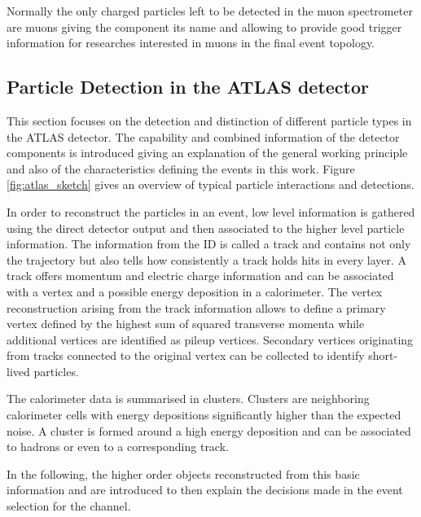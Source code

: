 Normally the only charged particles left to be detected in the muon spectrometer are muons giving the component its name and allowing to provide good trigger information for researches interested in muons in the final event topology.





\subsection{Particle Detection in the ATLAS detector}

This section focuses on the detection and distinction of different particle types in the ATLAS detector. The capability and combined information of the detector components is introduced giving an explanation of the general working principle and also of the characteristics defining the events in this work. Figure \ref{fig:atlas_sketch} gives an overview of typical particle interactions and detections.

In order to reconstruct the particles in an event, low level information is gathered using the direct detector output and then associated to the higher level particle information.
The information from the ID is called a track and contains not only the trajectory but also tells how consistently a track holds hits in every layer. A track offers momentum and electric charge information and can be associated with a vertex and a possible energy deposition in a calorimeter. 
The vertex reconstruction arising from the track information allows to define a primary vertex defined by the highest sum of squared transverse momenta while additional vertices are identified as pileup vertices.
Secondary vertices originating from tracks connected to the original vertex can be collected to identify short-lived particles.

The calorimeter data is summarised in clusters. Clusters are neighboring calorimeter cells with energy depositions significantly higher than the expected noise. A cluster is formed around a high energy deposition and can be associated to hadrons or even to a corresponding track.

In the following, the higher order objects reconstructed from this basic information and are introduced to then explain the decisions made in the event selection for the \tW channel.

